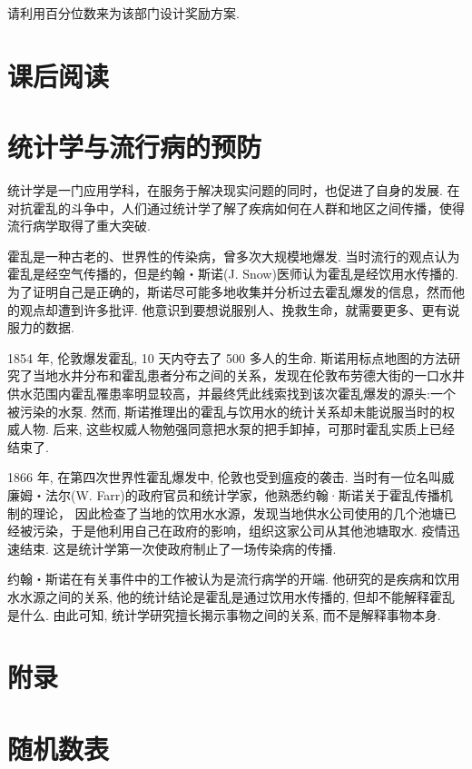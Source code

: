 \documentclass[10pt]{article}
\begin{document}
请利用百分位数来为该部门设计奖励方案.

\section*{课后阅读}

\section*{统计学与流行病的预防}

统计学是一门应用学科，在服务于解决现实问题的同时，也促进了自身的发展. 在对抗霍乱的斗争中，人们通过统计学了解了疾病如何在人群和地区之间传播，使得流行病学取得了重大突破.

霍乱是一种古老的、世界性的传染病，曾多次大规模地爆发. 当时流行的观点认为霍乱是经空气传播的，但是约翰・斯诺(J. Snow)医师认为霍乱是经饮用水传播的. 为了证明自己是正确的，斯诺尽可能多地收集并分析过去霍乱爆发的信息，然而他的观点却遭到许多批评. 他意识到要想说服别人、挽救生命，就需要更多、更有说服力的数据.

1854 年, 伦敦爆发霍乱, 10 天内夺去了 500 多人的生命. 斯诺用标点地图的方法研究了当地水井分布和霍乱患者分布之间的关系，发现在伦敦布劳德大街的一口水井供水范围内霍乱罹患率明显较高，并最终凭此线索找到该次霍乱爆发的源头:一个被污染的水泵. 然而, 斯诺推理出的霍乱与饮用水的统计关系却未能说服当时的权威人物. 后来, 这些权威人物勉强同意把水泵的把手卸掉，可那时霍乱实质上已经结束了.

1866 年, 在第四次世界性霍乱爆发中, 伦敦也受到瘟疫的袭击. 当时有一位名叫威廉姆・法尔(W. Farr)的政府官员和统计学家，他熟悉约翰·斯诺关于霍乱传播机制的理论， 因此检查了当地的饮用水水源，发现当地供水公司使用的几个池塘已经被污染，于是他利用自己在政府的影响，组织这家公司从其他池塘取水. 疫情迅速结束. 这是统计学第一次使政府制止了一场传染病的传播.

约翰・斯诺在有关事件中的工作被认为是流行病学的开端. 他研究的是疾病和饮用水水源之间的关系, 他的统计结论是霍乱是通过饮用水传播的, 但却不能解释霍乱是什么. 由此可知, 统计学研究擅长揭示事物之间的关系, 而不是解释事物本身.

\section*{附录}

\section*{随机数表}
\end{document}
